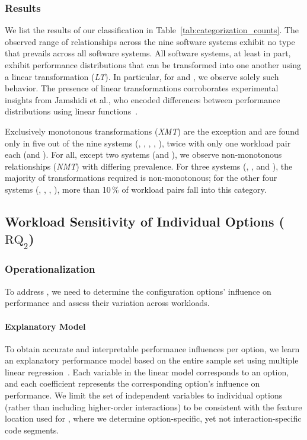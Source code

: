 {{\subsubsection{Results}
{\color{black}
We list the results of our classification in Table~\ref{tab:categorization_counts}. The observed range of relationships across the nine software systems exhibit no type that prevails across all software systems. 
All software systems, at least in part, exhibit performance distributions that can be transformed into one another using a linear transformation (\textit{\colorbox{lt-color!60}{LT}}). In particular, for \jumper and \xzwo, we observe solely such behavior. The presence of linear transformations corroborates experimental insights from Jamshidi et al., who encoded differences between performance distributions using linear functions~\cite{jamishidi_transfer_2017}.

Exclusively monotonous transformations (\textit{\colorbox{xmt-color!60}{XMT}}) are the exception and are found only in five out of the nine systems (\kanzi, \batik, \xz, \lrzip, \zdrei), twice with only one workload pair each (\xz and \zdrei).  
For all, except two systems (\jumper and \xzwo), we observe non-monotonous relationships (\textit{\colorbox{nmt-color!60}{NMT}}) with differing prevalence.  For three systems (\dconvert, \htwo, and \zdrei), the majority of transformations required is non-monotonous; for the other four systems (\kanzi, \batik, \xz, \lrzip), more than 10\,\% of workload pairs fall into this category.

\subsection{Workload Sensitivity of Individual Options ($\text{RQ}_\text{2}$)}\label{sec:rq2}
\subsubsection{Operationalization}
To address , we need to determine the configuration options’ influence on performance and assess their variation across workloads. 
\paragraph*{Explanatory Model}
To obtain accurate and interpretable performance influences per option, we learn an explanatory performance model based on the entire sample set using multiple linear regression~\cite{dorn2020,siegmundPerformanceinfluenceModelsHighly2015,perLasso}. Each variable in the linear model corresponds to an option, and each coefficient represents the corresponding option's influence on performance. 
We limit the set of independent variables to individual options (rather than including higher-order interactions) to be consistent with the feature location used for , where we determine option-specific, yet not interaction-specific code segments.
}}}

